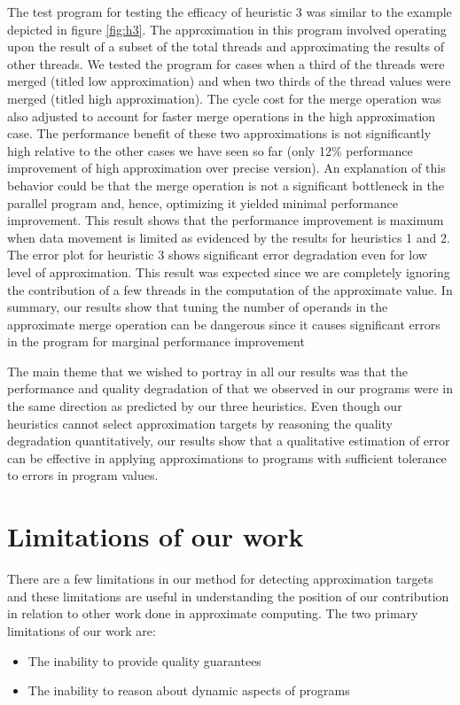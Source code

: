 \documentclass[12pt,conference]{IEEEtran}
\begin{document}
The test program for testing the efficacy of heuristic 3 was similar to the example depicted
in figure \ref{fig:h3}. The approximation in this program involved operating upon the
result of a subset of the total threads and approximating the results of other threads. We 
tested the program for cases when a third of the threads were merged (titled low approximation)
and when two thirds of the thread values were merged (titled high approximation). The cycle
cost for the merge operation was also adjusted to account for faster merge operations in
the high approximation case. The performance benefit of these two approximations is not 
significantly high relative to the other cases we have seen so far (only 
12\% performance improvement of high approximation over precise version). An explanation 
of this behavior could be that the merge operation is not a significant bottleneck in 
the parallel program and, hence, optimizing it yielded minimal performance improvement. 
This result shows that the performance improvement is maximum when data movement is 
limited as evidenced by the results for heuristics 1 and 2. The error plot for heuristic 3 
shows significant error degradation even for low level of approximation. This result
was expected since we are completely ignoring the contribution of a few threads in the 
computation of the approximate value. In summary, our results show that tuning the 
number of operands in the approximate merge operation can be dangerous since it causes
significant errors in the program for marginal performance improvement

The main theme that we wished to portray in all our results was that the 
performance and quality degradation of that we observed in our programs were in
the same direction as predicted by our three heuristics. Even though our heuristics cannot
select approximation targets by reasoning the quality degradation quantitatively, our 
results show that a qualitative estimation of error can be effective in applying 
approximations to programs with sufficient tolerance to errors in program values. 

 
\section{Limitations of our work} \label{sec:limitations}

There are a few limitations in our method for detecting approximation targets and these
limitations are useful in understanding the position of our contribution in 
relation to other work done in approximate computing. The two primary limitations 
of our work are:
\begin{itemize}
\item The inability to provide quality guarantees
\item The inability to reason about dynamic aspects of programs
\end{itemize}
\end{document}
